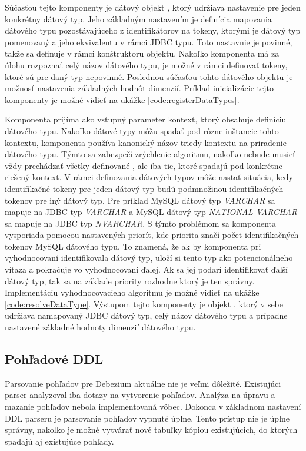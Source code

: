 Súčasťou tejto komponenty je dátový objekt , ktorý udržiava nastavenie pre jeden konkrétny dátový typ. Jeho základným nastavením je definícia mapovania dátového typu pozostávajúceho z identifikátorov na tokeny, ktorými je dátový typ pomenovaný a jeho ekvivalentu v rámci JDBC typu. Toto nastavnie je povinné, takže sa definuje v rámci konštruktoru  objektu. Nakoľko komponenta  má za úlohu rozpoznať celý názov dátového typu, je možné v rámci  definovať tokeny, ktoré sú pre daný typ nepovinné. Poslednou súčasťou tohto dátového objektu je možnosť nastavenia základných hodnôt dimenzií. Príklad inicializácie tejto komponenty je možné vidieť na ukážke \ref{code:registerDataTypes}.

Komponenta  prijíma ako vstupný parameter kontext, ktorý obsahuje definíciu dátového typu. Nakoľko dátové typy môžu spadať pod rôzne inštancie tohto kontextu, komponenta používa kanonický názov triedy kontextu na priradenie dátového typu. Týmto sa zabezpečí zrýchlenie algoritmu, nakoľko  nebude musieť vždy prechádzať všetky definované , ale iba tie, ktoré spadajú pod konkrétne riešený kontext. V rámci definovania dátových typov môže nastať situácia, kedy identifikačné tokeny pre jeden dátový typ budú podmnožinou identifikačných tokenov pre iný dátový typ. Pre príklad MySQL dátový typ \textit{VARCHAR} sa mapuje na  JDBC typ \textit{VARCHAR} a MySQL dátový typ \textit{NATIONAL VARCHAR} sa mapuje na JDBC typ \textit{NVARCHAR}. S týmto problémom sa komponenta vysporiada pomocou nastavených priorít, kde priorita značí počet identifikačných tokenov MySQL dátového typu. To znamená, že ak by komponenta pri vyhodnocovaní identifikovala dátový typ, uloží si tento typ ako potencionálneho víťaza a pokračuje vo vyhodnocovaní ďalej. Ak sa jej podarí identifikovať ďalší dátový typ, tak sa na základe priority rozhodne ktorý je ten správny. Implementáciu vyhodnocovacieho algoritmu je možné vidieť na ukážke \ref{code:resolveDataType}. Výstupom tejto komponenty je objekt , ktorý v sebe udržiava namapovaný JDBC dátový typ, celý názov dátového typu a prípadne nastavené základné hodnoty dimenzií dátového typu.

\subsection{Pohľadové DDL}
Parsovanie pohľadov pre Debezium aktuálne nie je veľmi dôležité. Existujúci parser analyzoval iba dotazy na vytvorenie pohľadov. Analýza na úpravu a mazanie pohľadov nebola implementovaná vôbec. Dokonca v základnom nastavení DDL parseru je parsovanie pohľadov vypnuté úplne. Tento prístup nie je úplne správny, nakoľko je možné vytvárať nové tabuľky kópiou existujúcich, do ktorých spadajú aj existujúce pohľady.

